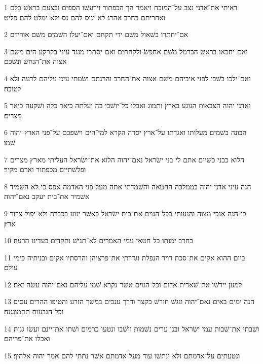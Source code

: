 \par 1 ראיתי את־אדני נצב על־המזבח ויאמר הך הכפתור וירעשׁו הספים ובצעם בראשׁ כלם ואחריתם בחרב אהרג לא־ינוס להם נס ולא־ימלט להם פליט׃
\par 2 אם־יחתרו בשׁאול משׁם ידי תקחם ואם־יעלו השׁמים משׁם אורידם׃
\par 3 ואם־יחבאו בראשׁ הכרמל משׁם אחפשׂ ולקחתים ואם־יסתרו מנגד עיני בקרקע הים משׁם אצוה את־הנחשׁ ונשׁכם׃
\par 4 ואם־ילכו בשׁבי לפני איביהם משׁם אצוה את־החרב והרגתם ושׂמתי עיני עליהם לרעה ולא לטובה׃
\par 5 ואדני יהוה הצבאות הנוגע בארץ ותמוג ואבלו כל־יושׁבי בה ועלתה כיאר כלה ושׁקעה כיאר מצרים׃
\par 6 הבונה בשׁמים מעלותו ואגדתו על־ארץ יסדה הקרא למי־הים וישׁפכם על־פני הארץ יהוה שׁמו׃
\par 7 הלוא כבני כשׁיים אתם לי בני ישׂראל נאם־יהוה הלוא את־ישׂראל העליתי מארץ מצרים ופלשׁתיים מכפתור וארם מקיר׃
\par 8 הנה עיני אדני יהוה בממלכה החטאה והשׁמדתי אתה מעל פני האדמה אפס כי לא השׁמיד אשׁמיד את־בית יעקב נאם־יהוה׃
\par 9 כי־הנה אנכי מצוה והנעותי בכל־הגוים את־בית ישׂראל כאשׁר ינוע בכברה ולא־יפול צרור ארץ׃
\par 10 בחרב ימותו כל חטאי עמי האמרים לא־תגישׁ ותקדים בעדינו הרעה׃
\par 11 ביום ההוא אקים את־סכת דויד הנפלת וגדרתי את־פרציהן והרסתיו אקים ובניתיה כימי עולם׃
\par 12 למען יירשׁו את־שׁארית אדום וכל־הגוים אשׁר־נקרא שׁמי עליהם נאם־יהוה עשׂה זאת׃
\par 13 הנה ימים באים נאם־יהוה ונגשׁ חורשׁ בקצר ודרך ענבים במשׁך הזרע והטיפו ההרים עסיס וכל־הגבעות תתמוגגנה׃
\par 14 ושׁבתי את־שׁבות עמי ישׂראל ובנו ערים נשׁמות וישׁבו ונטעו כרמים ושׁתו את־יינם ועשׂו גנות ואכלו את־פריהם׃
\par 15 ונטעתים על־אדמתם ולא ינתשׁו עוד מעל אדמתם אשׁר נתתי להם אמר יהוה אלהיך׃


